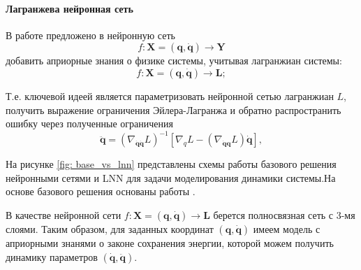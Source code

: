 \documentclass[12pt, twoside]{article}
\begin{document}
\paragraph{Лагранжева нейронная сеть}

В работе \cite{Cranmer2020LagrangianNN} предложено в нейронную сеть $$f: \mathbf{X} = (\mathbf{q}, \mathbf{\dot{q}}) \rightarrow \mathbf{Y}$$
 добавить априорные знания о физике системы, учитывая лагранжиан системы:
$$f: \mathbf{X} = (\mathbf{q}, \mathbf{\dot{q}}) \rightarrow \mathbf{L};$$

Т.е. ключевой идеей является параметризовать нейронной сетью лагранжиан $L$, получить выражение ограничения Эйлера-Лагранжа и обратно распространить ошибку через полученные ограничения
$$\ddot{\mathbf{q}} =\left(\nabla_{\dot{\mathbf{q}} \dot{\mathbf{q}}} L\right)^{-1}\left[\nabla_{q} L-\left(\nabla_{\dot{\mathbf{q}}\mathbf{q}} L\right) \dot{\mathbf{q}}\right],$$ 

На рисунке \ref{fig: base_vs_lnn} представлены схемы работы базового решения нейронными сетями и LNN для задачи моделирования динамики системы.На основе базового решения основаны работы \cite{NEURIPS2018_69386f6b, 712178}.

\begin{comment}
\begin{figure}[H]
	\centering
	\begin{subfigure}[b]{0.49\textwidth}
		\centering
		\texttt{[image: baseline\_nn\_scheme.png]}
		\caption{Базовое решение нейронными сетями}
		\label{fig:y equals x}
	\end{subfigure}
	\hfill
	\begin{subfigure}[b]{0.49\textwidth}
		\centering
		\texttt{[image: lnn\_scheme.png]}
		\caption{Решение LNN}
		\label{fig:three sin x}
	\end{subfigure}
\caption{Схемы работы базового решения нейронными сетями (a) и LNN (b) для задачи моделирования динамики физической системы}
\label{fig: base_vs_lnn}
\end{figure}
 \end{comment}

В качестве нейронной сети $f: \mathbf{X} = (\mathbf{q}, \mathbf{\dot{q}}) \rightarrow \mathbf{L}$ берется полносвязная сеть с 3-мя слоями. Таким образом, для заданных координат  $(\mathbf{q}, \mathbf{\dot{q}})$ имеем модель с априорными знанями о законе сохранения энергии, которой можем получить динамику параметров $(\mathbf{\dot{q}}, \mathbf{\ddot{q}})$.
\end{document}

